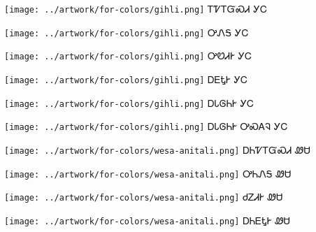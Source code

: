 \documentclass[avery5371,frame]{flashcards}%
\begin{document}
\begin{flashcard}{
\texttt{[image: ../artwork/for-colors/gihli.png]}
}
\Huge ᎢᏤᎢᏳᏍᏗ ᎩᏟ
\end{flashcard}

\begin{flashcard}{
\texttt{[image: ../artwork/for-colors/gihli.png]}
}
\Huge ᎤᏁᎦ ᎩᏟ
\end{flashcard}

\begin{flashcard}{
\texttt{[image: ../artwork/for-colors/gihli.png]}
}
\Huge ᎤᏬᏗᎨ ᎩᏟ
\end{flashcard}

\begin{flashcard}{
\texttt{[image: ../artwork/for-colors/gihli.png]}
}
\Huge ᎠᎬᎿᎨ ᎩᏟ
\end{flashcard}

\begin{flashcard}{
\texttt{[image: ../artwork/for-colors/gihli.png]}
}
\Huge ᎠᏓᎶᏂᎨ ᎩᏟ
\end{flashcard}

\begin{flashcard}{
\texttt{[image: ../artwork/for-colors/gihli.png]}
}
\Huge ᎠᏓᎶᏂᎨ ᎤᏍᎪᎸ ᎩᏟ
\end{flashcard}

\begin{flashcard}{
\texttt{[image: ../artwork/for-colors/wesa-anitali.png]}
}
\Huge ᎠᏂᏤᎢᏳᏍᏗ ᏪᏌ
\end{flashcard}

\begin{flashcard}{
\texttt{[image: ../artwork/for-colors/wesa-anitali.png]}
}
\Huge ᎤᏂᏁᎦ ᏪᏌ
\end{flashcard}

\begin{flashcard}{
\texttt{[image: ../artwork/for-colors/wesa-anitali.png]}
}
\Huge ᏧᏃᏗᎨ ᏪᏌ
\end{flashcard}

\begin{flashcard}{
\texttt{[image: ../artwork/for-colors/wesa-anitali.png]}
}
\Huge ᎠᏂᎬᎿᎨ ᏪᏌ
\end{flashcard}
\end{document}
